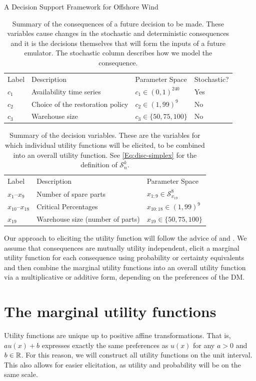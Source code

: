 \begin{chapter}{A Decision Support Framework for Offshore Wind \label{Ch:ds-for-ow}}
\begin{table}[t]
	\centering
	\begin{tabular}{llll}
		\toprule
  Label & Description & Parameter Space & Stochastic?\\\cmidrule{1-4}
  $c_1$ & Availability time series & $c_1 \in (0, 1)^{240}$& Yes\\
  $c_2$ & Choice of the restoration policy &$c_2 \in (1, 99)^9$& No\\
  $c_3$ & Warehouse size & $c_3 \in \{50, 75, 100\}$& No\\\bottomrule
	\end{tabular}
	\caption{Summary of the consequences of a future decision to be made. These variables cause changes in the stochastic and deterministic consequences and it is the decisions themselves that will form the inputs of a future emulator.	The stochastic column describes how we model the consequence. \label{Tab:consequences}}
\end{table}
\begin{table}[t]
	\centering
	\begin{tabular}{lll}
		\toprule
  Label & Description & Parameter Space\\\cmidrule{1-3}
  $x_1$--$x_9$ & Number of spare parts & $x_{1:9} \in \mathcal{S}^{8}_{x_{19}}$\\
  $x_{10}$--$x_{18}$ & Critical Percentages & $x_{10:18} \in (1,99)^9$\\
  $x_{19}$ & Warehouse size (number of parts) & $x_{19} \in \{ 50, 75, 100 \}$\\\bottomrule
	\end{tabular}
	\caption{Summary of the decision variables. These are the variables for which individual utility functions will be elicited, to be combined into an overall utility function. See \cref{Eq:disc-simplex} for the definition of $\mathcal{S}^k_n$.	\label{Tab:consequences}}
\end{table}
Our approach to eliciting the utility function will follow the advice of \citet{Smith2010} and \citet{Keeney1976}. We assume that consequences are mutually utility independent, elicit a marginal utility function for each consequence using probability or certainty equivalents and then combine the marginal utility functions into an overall utility function via a multiplicative or additive form, depending on the preferences of the DM.
\section{The marginal utility functions}
Utility functions are unique up to positive affine transformations. That is, $au(x) + b$ expresses exactly the same preferences as $u(x)$ for any $a > 0$ and $b \in \mathbb{R}$. For this reason, we will construct all utility functions on the unit interval. This also allows for easier elicitation, as utility and probability will be on the same scale.

\end{chapter}

